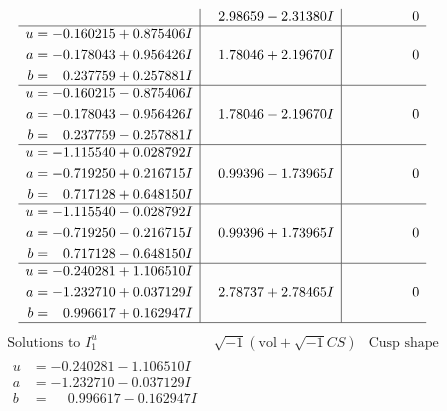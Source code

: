 \documentclass[1p]{elsarticle_modified}
\theoremstyle{definition}
\newcommand{\I}{\sqrt{-1}}
\begin{document}
$$\begin{array}{c|c|c}
 & \phantom{-}2.98659 - 2.31380 I & \phantom{-0.000000 } 0 \\ \hline\begin{aligned}
u &= -0.160215 + 0.875406 I \\
a &= -0.178043 + 0.956426 I \\
b &= \phantom{-}0.237759 + 0.257881 I\end{aligned}
 & \phantom{-}1.78046 + 2.19670 I & \phantom{-0.000000 } 0 \\ \hline\begin{aligned}
u &= -0.160215 - 0.875406 I \\
a &= -0.178043 - 0.956426 I \\
b &= \phantom{-}0.237759 - 0.257881 I\end{aligned}
 & \phantom{-}1.78046 - 2.19670 I & \phantom{-0.000000 } 0 \\ \hline\begin{aligned}
u &= -1.115540 + 0.028792 I \\
a &= -0.719250 + 0.216715 I \\
b &= \phantom{-}0.717128 + 0.648150 I\end{aligned}
 & \phantom{-}0.99396 - 1.73965 I & \phantom{-0.000000 } 0 \\ \hline\begin{aligned}
u &= -1.115540 - 0.028792 I \\
a &= -0.719250 - 0.216715 I \\
b &= \phantom{-}0.717128 - 0.648150 I\end{aligned}
 & \phantom{-}0.99396 + 1.73965 I & \phantom{-0.000000 } 0 \\ \hline\begin{aligned}
u &= -0.240281 + 1.106510 I \\
a &= -1.232710 + 0.037129 I \\
b &= \phantom{-}0.996617 + 0.162947 I\end{aligned}
 & \phantom{-}2.78737 + 2.78465 I & \phantom{-0.000000 } 0\\
 \hline 
 \end{array}$$\newpage$$\begin{array}{c|c|c}  
\text{Solutions to }I^u_{1}& \I (\text{vol} + \sqrt{-1}CS) & \text{Cusp shape}\\
 \hline 
\begin{aligned}
u &= -0.240281 - 1.106510 I \\
a &= -1.232710 - 0.037129 I \\
b &= \phantom{-}0.996617 - 0.162947 I\end{aligned}

\end{array}$$
\end{document}
